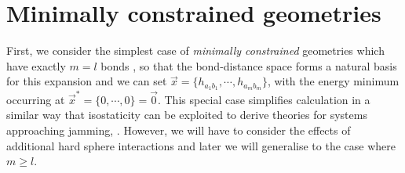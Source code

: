 \documentclass[11pt,twoside]{report}
\begin{document}


\section{Minimally constrained geometries}
\label{sec:no-ep-integration}

First, we consider the simplest case of \emph{minimally constrained} geometries which have exactly $m = l$ bonds%
,
so that the bond-distance space forms a natural basis for this expansion and we can set $\vec{x} = \{h_{a_1 b_1}, \cdots, h_{a_m b_m}\}$, with the energy minimum occurring at $\vec{x}^* = \{0, \cdots, 0\} = \vec{0}$.
This special case simplifies calculation in a similar way that isostaticity can be exploited to derive theories for systems approaching jamming, \cite{WyartAP2005,BritoEEL2006}.
However, we will have to consider the effects of additional hard sphere interactions and later we will generalise to the case where $m \ge l$.
\end{document}
